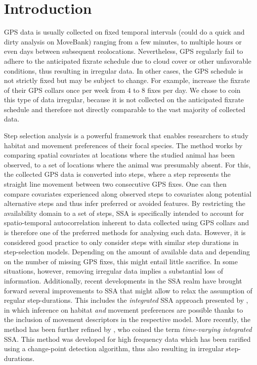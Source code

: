 \documentclass[abstract=on,10pt,a4paper,bibliography=totocnumbered]{article}
\begin{document}
\section{Introduction}
GPS data is usually collected on fixed temporal intervals (could do a quick and
dirty analysis on MoveBank) ranging from a few minutes, to multiple hours or
even days between subsequent reolocations. Nevertheless, GPS regularly fail to
adhere to the anticipated fixrate schedule due to cloud cover or other
unfavorable conditions, thus resulting in irregular data. In other cases, the
GPS schedule is not strictly fixed but may be subject to change. For example,
\cite{Cozzi.2020} increase the fixrate of their GPS collars once per week from 4
to 8 fixes per day. We chose to coin this type of data irregular, because it is
not collected on the anticipated fixrate schedule and therefore not directly
comparable to the vast majority of collected data.

Step selection analysis is a powerful framework that enables researchers to
study habitat and movement preferences of their focal species. The method works
by comparing spatial covariates at locations where the studied animal has been
observed, to a set of locations where the animal was presumably absent. For
this, the collected GPS data is converted into steps, where a step represents
the straight line movement between two consecutive GPS fixes. One can then
compare covariates experienced along observed steps to covariates along
potential alternative steps and thus infer preferred or avoided features. By
restricting the availability domain to a set of steps, SSA is specifically
intended to account for spatio-temporal autocorrelation inherent to data
collected using GPS collars and is therefore one of the preferred methods for
analysing such data. However, it is considered good practice to only consider
steps with similar step durations in step-selection models. Depending on the
amount of available data and depending on the number of missing GPS fixes, this
might entail little sacrifice. In some situations, however, removing irregular
data implies a substantial loss of information. Additionally, recent
developments in the SSA realm have brought forward several improvements to SSA
that might allow to relax the assumption of regular step-durations. This
includes the \textit{integrated} SSA approach presented by \citep{Avgar.2016},
in which inference on habitat \textit{and} movement preferences are possible
thanks to the inclusion of movement descriptors in the respective model. More
recently, the method has been further refined by \citep{Munden.2021}, who coined
the term \textit{time-varying integrated} SSA. This method was developed for
high frequency data which has been rarified using a change-point detection
algorithm, thus also resulting in irregular step-durations.
\end{document}
